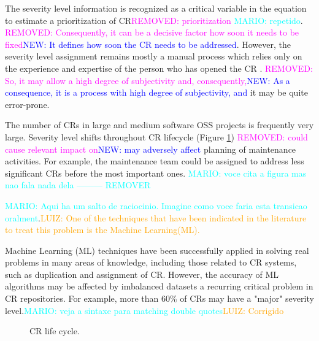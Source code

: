 \documentclass[10pt, conference]{IEEEtran}
\newcommand{\luiz}[1]{\noindent\textcolor{orange}{LUIZ: {#1}}}
\newcommand{\mario}[1]{\noindent\textcolor{cyan}{MARIO: {#1}}}
\newcommand{\rem}[1]{\noindent\textcolor{magenta}{REMOVED: {#1}}}
\newcommand{\new}[1]{\noindent\textcolor{blue}{NEW: {#1}}}
\newcommand{\luiz}[1]{}
\newcommand{\mario}[1]{}
\newcommand{\rem}[1]{}
\newcommand{\new}[1]{#1}
\begin{document}
The severity level information is recognized as a critical variable in the equation to estimate a prioritization of CR\rem{prioritization}\cite{Tian2012} \mario{repetido}. \rem{Consequently, it can be a decisive factor how soon it needs to be fixed\cite{Lamkanfi2010}}\new{It defines how soon the CR needs to be addressed\cite{Lamkanfi2010}}. However, the severity level assignment remains mostly a manual process which relies only on the experience and expertise of the person who has opened the CR \cite{Cavalcanti2014, Tian2012, Lamkanfi2010}. \rem{So, it may allow a high degree of subjectivity and, consequently,}\new{As a consequence, it is a process with high degree of subjectivity, and} it may be quite error-prone. 

The number of CRs in large and medium software OSS projects\cite{Lamkanfi2011} is frequently very large. Severity level shifts throughout CR lifecycle (Figure \ref{fig:cr-life-cycle}) \rem{could cause relevant impact on}\new{may adversely affect} planning of maintenance activities. For example, the maintenance team could be assigned to address less significant CRs before the most important ones. \mario{voce cita a figura mas nao fala nada dela --------- REMOVER}

\mario{Aqui ha um salto de raciocinio. Imagine como voce faria esta transicao oralment}.\luiz{One of the techniques that have been indicated in the literature\cite{Cavalcanti2014} to treat this problem is the Machine Learning(ML).}

Machine Learning (ML) techniques have been successfully applied in solving real problems in many areas of knowledge, including those related to CR systems, such as duplication and assignment of CR\cite{Cavalcanti2014}. However, the accuracy of ML algorithms may be affected by imbalanced datasets \cite{Chawla2009} \textemdash  a recurring critical problem in CR repositories\cite{Tian2015}. For example, more than 60\% of CRs may have a "major" severity level.\mario{veja a sintaxe para matching double quotes}\luiz{Corrigido}


\begin{figure}[hbt!]  
  \centering
  \caption{CR life cycle\cite{Sommerville2010}.}
  \label{fig:cr-life-cycle}
\end{figure}
\end{document}
